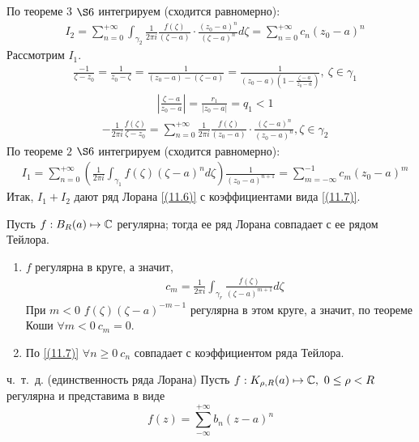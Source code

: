 \begin{enumerate}
    По теореме $3$ $\S 6$ интегрируем (сходится равномерно):
    \begin{align*}
      & I_2 = \sum_{n=0}^{+\infty}\int_{\gamma_2} \frac{1}{2 \pi i}\frac{f(\zeta)}{(\zeta - a)}\cdot \frac{(z_0-a)^n}{(\zeta - a)^n} d\zeta = \sum_{n=0}^{+\infty} c_n(z_0-a)^n
    \end{align*}
    Рассмотрим $I_1$.
    \begin{align*}
      & \frac{-1}{\zeta - z_0} = \frac{1}{z_0-\zeta} = \frac{1}{(z_0 - a) - (\zeta-a)} = \frac{1}{(z_0 - a)\left( 1 - \frac{\zeta-a}{z_0-a} \right)}, \ \zeta \in \gamma_1
    \end{align*}
    \begin{align*}
      & \left| \frac{\zeta-a}{z_0 - a} \right| = \frac{r_1}{\left| z_0-a \right|} = q_1 < 1
    \end{align*}
    \begin{align*}
      & -\frac{1}{2 \pi i}\frac{f(\zeta)}{\zeta - z_0} = \sum_{n=0}^{+\infty}\frac{1}{2\pi i}\frac{f(\zeta)}{(z_0 - a)} \cdot \frac{(\zeta-a)^n}{(z_0 - a)^n}, \zeta \in \gamma_2
    \end{align*}
    По теореме $2$ $\S 6$ интегрируем (сходится равномерно):
    \begin{align*}
      & I_1 = \sum_{n=0}^{+\infty}\left( \frac{1}{2\pi i}\int_{\gamma_1}f(\zeta)(\zeta - a)^n d\zeta \right) \frac{1}{(z_0-a)^{n+1}} = \sum_{m = -\infty}^{-1}c_m(z_0-a)^m
    \end{align*}
    Итак, $I_1+I_2$ дают ряд Лорана \eqref{(11.6)} с коэффициентами вида \eqref{(11.7)}.
\end{enumerate}
\corollary
Пусть $f: B_R(a) \mapsto \mathbb{C}$ регулярна; тогда ее ряд Лорана совпадает с ее
рядом Тейлора.
\pr
~
\begin{enumerate}
    \item $f$ регулярна в круге, а значит,
    \begin{align*}
      & c_m = \frac{1}{2 \pi i}\int_{\gamma_r}\frac{f(\zeta)}{(\zeta - a)^{m+1}}d \zeta
    \end{align*}
    При $m < 0$ $f(\zeta)(\zeta - a)^{-m-1}$ регулярна в этом круге, а значит,
    по теореме Коши $\forall m < 0 \ c_m = 0$.
    \item По \eqref{(11.7)} $\forall n \geq  0 \ c_n$ совпадает с
    коэффициентом ряда Тейлора.
\end{enumerate}
ч.~т.~д.
\theorem (единственность ряда Лорана)
Пусть $f:K_{\rho,R}(a) \mapsto \mathbb{C}, \ 0 \leq \rho < R$ регулярна и представима в
виде
\begin{equation}\label{(11.8)}
  f(z) = \sum_{-\infty}^{+\infty} b_n(z-a)^n
\end{equation}
